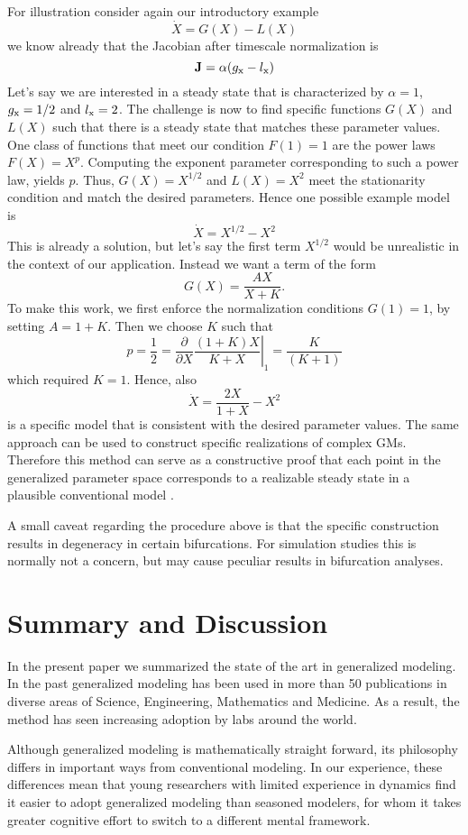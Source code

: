 \documentclass{article}
\newcommand{\eq}[1]{\begin{equation}#1\end{equation}}
\begin{document}
For illustration consider again our introductory example  
\eq{
\dot{X}=G(X)-L(X)
}
we know already that the Jacobian after timescale normalization is 
\eq{
{\bf J} = \alpha (g_{\rm x} - l_{\rm x})
}
Let's say we are interested in a steady state that is characterized by $\alpha=1$, $g_{\rm x}=1/2$ and $l_{\rm x}=2$. The challenge is now to find specific functions $G(X)$ and $L(X)$ such that there is a steady state that matches these parameter values. One class of functions that meet our condition $F(1)=1$ are the power laws $F(X)=X^p$. Computing the exponent parameter corresponding to such a power law, yields $p$. Thus, $G(X)=X^{1/2}$ and $L(X)=X^2$ meet the stationarity condition and match the desired parameters. Hence one possible example model is 
\eq{
\dot{X}=X^{1/2}-X^2
}
This is already a solution, but let's say the first term $X^{1/2}$ would be unrealistic in the context of our application. Instead we want a term of the form 
\eq{
G(X)= \frac{AX}{X+K}.
}
To make this work, we first enforce the normalization conditions $G(1)=1$, by setting $A=1+K$. Then we choose $K$ such that 
\eq{
p=\frac{1}{2} = \left. \frac{\partial}{\partial X}  \frac{(1+K)X}{K+X} \right|_1
= \frac{K}{(K+1)}  
}
which required $K=1$. Hence, also 
\eq{
\dot{X}= \frac{2X}{1+X} -X^2
}
is a specific model that is consistent with the desired parameter values. The same approach can be used to construct specific realizations of complex GMs. Therefore this method can serve as a constructive proof that each point in the generalized parameter space corresponds to a realizable steady state in a plausible conventional model \citep{Kuehn2013AppMath}. 

A small caveat regarding the procedure above is that the specific construction results in degeneracy in certain bifurcations. For simulation studies this is normally not a concern, but may cause peculiar results in bifurcation analyses.  

\section{Summary and Discussion}
In the present paper we summarized the state of the art in generalized modeling. In the past generalized modeling has been used in more than 50 publications in diverse areas of Science, Engineering, Mathematics and Medicine. As a result, the method has seen increasing adoption by labs around the world. 

Although generalized modeling is mathematically straight forward, its philosophy differs in important ways from conventional modeling. In our experience, these differences mean that young researchers with limited experience in dynamics find it easier to adopt generalized modeling than seasoned modelers, for whom it takes greater cognitive effort to switch to a different mental framework.   
\end{document}

